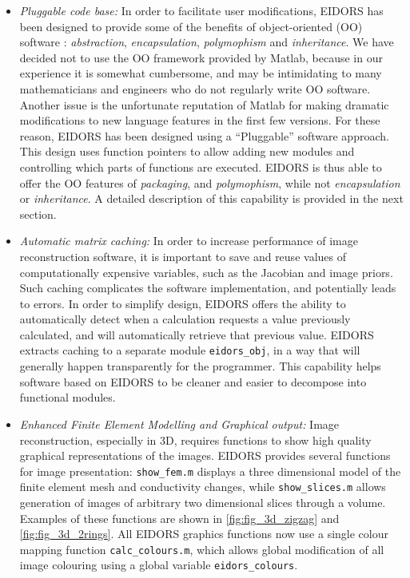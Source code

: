 \documentclass[12pt]{iopart}
\begin{document}
\begin{itemize}
  \item {\em Pluggable code base:}
In order to facilitate user modifications, EIDORS
has been designed to provide some of the benefits of
object-oriented (OO) software \cite{Gamma_etal_1995}:
{\em abstraction}, {\em encapsulation}, 
{\em polymophism} and {\em inheritance}.
We have decided not to
use the OO framework provided by Matlab, because
in our experience it is somewhat cumbersome,
and may be intimidating
to many mathematicians and engineers who do not 
regularly write OO software.
Another issue is the unfortunate reputation of
Matlab for making dramatic modifications to new
language features in the first few versions.
For these reason, EIDORS has been designed using
a  ``Pluggable'' software approach.
This design uses function
pointers to allow adding new modules and controlling
which parts of functions are executed.
EIDORS is thus able to offer the OO features 
of {\em packaging}, and {\em polymophism}, while
not {\em encapsulation} or {\em inheritance}.
A detailed description of this capability is
provided in the next section.

  \item {\em Automatic matrix caching:}
In order to increase
performance of image reconstruction software, it is important to save
and reuse values of 
computationally expensive variables, such as the Jacobian and image priors.
Such caching complicates the software implementation, and
potentially leads to errors. In order to simplify design, EIDORS
offers the ability to automatically detect when a calculation
requests a value previously calculated, and will automatically
retrieve that previous value.
EIDORS extracts caching to a separate module {\tt eidors\_obj},
in a way that will generally happen transparently for the
programmer. This capability helps software based on EIDORS
to be cleaner and easier to decompose into functional
modules.


  \item {\em Enhanced Finite Element Modelling and Graphical output:}
Image reconstruction, especially in 3D, requires functions
to show high quality graphical representations of the images.
EIDORS provides several functions for image presentation:
{\tt show\_fem.m} displays a three dimensional model of the
finite element mesh and conductivity changes, while
{\tt show\_slices.m} allows generation of images of arbitrary
two dimensional slices through a volume. Examples of these
functions are shown in \ref{fig:fig_3d_zigzag} and \ref{fig:fig_3d_2rings}.
All EIDORS graphics functions now use a single colour
mapping function {\tt calc\_colours.m}, which allows
global modification of all image colouring using a
global variable {\tt eidors\_colours}.



\end{itemize}
\end{document}

